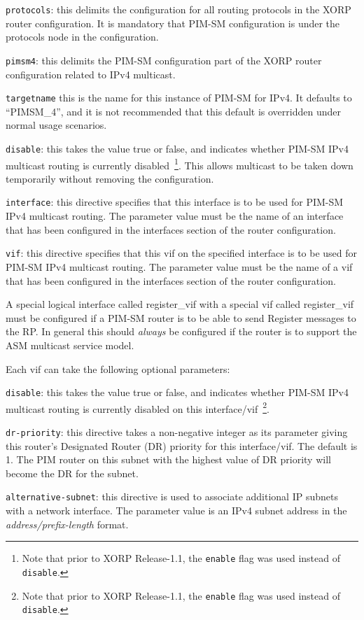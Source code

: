 \begin{description}
\item{\tt protocols}: this delimits the configuration for all routing
  protocols in the XORP router configuration.  It is mandatory that
  PIM-SM configuration is under the {\stt protocols} node in the
  configuration.
\item{\tt pimsm4}: this delimits the PIM-SM configuration part of the XORP
  router configuration related to IPv4 multicast.
\item{\tt targetname} this is the name for this instance of PIM-SM for
  IPv4.  It defaults to ``{\stt PIMSM\_4}'', and it is not recommended
  that this default is overridden under normal usage scenarios.
\item{\tt disable}: this takes the value {\stt true} or {\stt false},
  and indicates whether PIM-SM IPv4 multicast routing is currently
  disabled~\footnote{Note
  that prior to XORP Release-1.1, the {\tt enable} flag was used instead of
  {\tt disable}.}.
  This allows multicast to be taken down temporarily without
  removing the configuration.
\item{\tt interface}: this directive specifies that this {\stt
  interface} is to be used for PIM-SM IPv4 multicast routing.  The
  parameter value must be the name of an interface that has been
  configured in the {\stt interfaces} section of the router
  configuration.
\item{\tt vif}: this directive specifies that this {\stt vif}
  on the specified {\stt interface} is to be used for PIM-SM IPv4
  multicast routing.  The parameter value must be the name of a vif
  that has been configured in the {\stt interfaces} section of the
  router configuration.

  A special logical interface called {\stt register\_vif} with a
  special vif called {\stt register\_vif} must be configured if a
  PIM-SM router is to be able to send Register messages to the RP.  In
  general this should {\it always} be configured if the router is to
  support the ASM multicast service model.

  Each {\stt vif} can take the following optional parameters:
\begin{description}
\item{\tt disable}: this takes the value {\stt true} or {\stt false},
  and indicates whether PIM-SM IPv4 multicast routing is currently
  disabled on this interface/vif~\footnote{Note
  that prior to XORP Release-1.1, the {\tt enable} flag was used instead of
  {\tt disable}.}.
\item{\tt dr-priority}: this directive takes a non-negative integer as
  its parameter giving this router's Designated Router (DR) priority
  for this interface/vif.  The default is 1.  The PIM router on this
  subnet with the highest value of DR priority will become the DR for
  the subnet.
\item{\tt alternative-subnet}: this directive is used to associate
  additional IP subnets with a network interface. The parameter value
  is an IPv4 subnet address in the {\it address/prefix-length} format.


\end{description}
\end{description}
